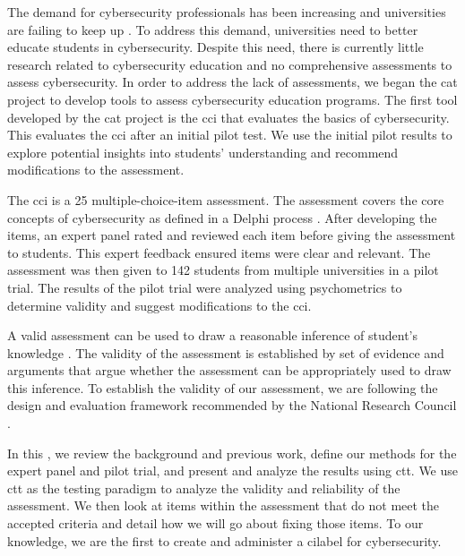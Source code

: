 The demand for cybersecurity professionals has been increasing and universities are failing to keep up \cite{workforce, hackers_wanted}. To address this demand, universities need to better educate students in cybersecurity. Despite this need, there is currently little research related to cybersecurity education and no comprehensive assessments to assess cybersecurity. In order to address the lack of assessments, we began the \gls{cat} project to develop tools to assess cybersecurity education programs. The first tool developed by the \gls{cat} project is the \gls{cci} that evaluates the basics of cybersecurity. This \DocTitle evaluates the \gls{cci} after an initial pilot test. We use the initial pilot results to explore potential insights into students' understanding and recommend modifications to the assessment. 

The \gls{cci} is a 25 multiple-choice-item assessment. The assessment covers the core concepts of cybersecurity as defined in a Delphi process \cite{delphi}. After developing the items, an expert panel rated and reviewed each item before giving the assessment to students. This expert feedback ensured items were clear and relevant. The assessment was then given to 142 students from multiple universities in a pilot trial. The results of the pilot trial were analyzed using psychometrics to determine validity and suggest modifications to the \gls{cci}. 

A valid assessment can be used to draw a reasonable inference of student's knowledge \cite{douglas_purzer}. The validity of the assessment is established by set of evidence and arguments that argue whether the assessment can be appropriately used to draw this inference. To establish the validity of our assessment, we are following the design and evaluation framework recommended by the National Research Council \cite{libarkin,knowing_what_students_know}.


In this \NoSpaceDocTitle, we review the background and previous work, define our methods for the expert panel and pilot trial, and present and analyze the results using \gls{ctt}. We use \gls{ctt} as the testing paradigm to analyze the validity and reliability of the assessment. We then look at items within the assessment that do not meet the accepted criteria and detail how we will go about fixing those items. To our knowledge, we are the first to create and administer a \gls{cilabel} for cybersecurity. 
